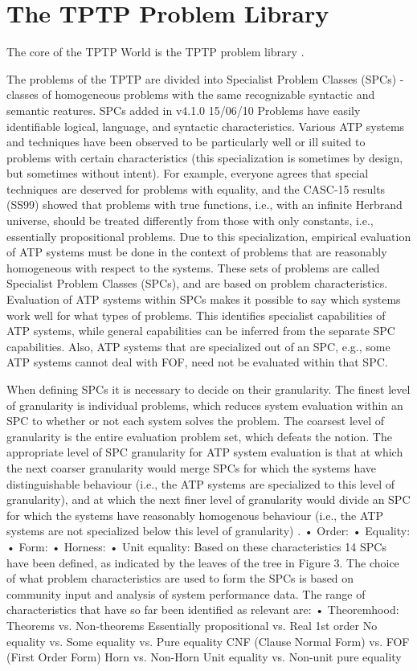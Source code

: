 \documentclass[runningheads]{llncs}
\begin{document}
\section{The TPTP Problem Library}
\label{TPTP}

The core of the TPTP World is the TPTP problem library \cite{Sut09}.

The problems of the TPTP are divided into Specialist Problem Classes (SPCs) - classes of 
homogeneous problems with the same recognizable syntactic and semantic reatures.
SPCs added in v4.1.0 15/06/10
Problems have easily identifiable logical, language, and syntactic characteristics. 
Various ATP systems and techniques have been observed to be particularly well or ill suited to 
problems with certain characteristics (this specialization is sometimes by design, but sometimes 
without intent). 
For example, everyone agrees that special techniques are deserved for problems with equality, 
and the CASC-15 results (SS99) showed that problems with true functions, i.e., with an infinite 
Herbrand universe, should be treated differently from those with only constants, i.e., essentially 
propositional problems. 
Due to this specialization, empirical evaluation of ATP systems must be done in the context of 
problems that are reasonably homogeneous with respect to the systems. 
These sets of problems are called Specialist Problem Classes (SPCs), and are based on problem 
characteristics. 
Evaluation of ATP systems within SPCs makes it possible to say which systems work well for what 
types of problems. 
This identifies specialist capabilities of ATP systems, while general capabilities can be 
inferred from the separate SPC capabilities. Also, ATP systems that are specialized out of 
an SPC, e.g., some ATP systems cannot deal with FOF, need not be evaluated within that SPC.

When defining SPCs it is necessary to decide on their granularity. 
The finest level of granularity is individual problems, which reduces system evaluation within an 
SPC to whether or not each system solves the problem. 
The coarsest level of granularity is the entire evaluation problem set, which defeats the notion. 
The appropriate level of SPC granularity for ATP system evaluation is that at which the next 
coarser granularity would merge SPCs for which the systems have distinguishable behaviour (i.e., 
the ATP systems are specialized to this level of granularity), and at which the next finer level 
of granularity would divide an SPC for which the systems have reasonably homogenous behaviour 
(i.e., the ATP systems are not specialized below this level of granularity) \cite{FS02}.
• Order:
• Equality:
• Form:
• Horness:
• Unit equality:
Based on these characteristics 14 SPCs have been defined, as indicated by the leaves of the tree in Figure 3.
The choice of what problem characteristics are used to form the SPCs is based on community input and analysis of system performance data. The range of characteristics that have so far been identified as relevant are:
• Theoremhood:
Theorems vs. Non-theorems
Essentially propositional vs. Real 1st order
No equality vs. Some equality vs. Pure equality
CNF (Clause Normal Form) vs. FOF (First Order Form) Horn vs. Non-Horn
Unit equality vs. Non-unit pure equality
\end{document}
